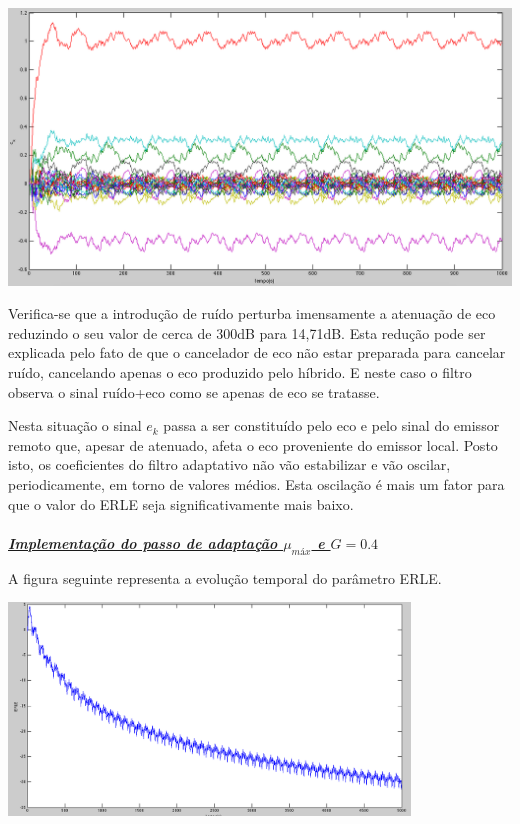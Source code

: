 \documentclass[a4paper,11pt]{report}
\begin{document}
\begin{center}
     \includegraphics[angle=0,width=1\textwidth]{c_k_G0_1}
     \label{fig:SRuRUIDOt}
\end{center}
     
Verifica-se que a introdução de ruído perturba imensamente a atenuação de eco reduzindo o seu valor de cerca de 300dB para 14,71dB. Esta redução pode ser explicada pelo fato de que o cancelador de eco não estar preparada para cancelar ruído, cancelando apenas o eco produzido pelo híbrido. E neste caso o filtro observa o sinal ruído+eco como se apenas de eco se tratasse.

Nesta situação o sinal $e_k$ passa a ser constituído pelo eco e pelo sinal do emissor remoto que, apesar de atenuado, afeta o eco proveniente do emissor local. Posto isto, os coeficientes do filtro adaptativo não vão estabilizar e vão oscilar, periodicamente, em torno de valores médios. Esta oscilação é mais um fator para que o valor do ERLE seja significativamente mais baixo.
\paragraph{}


\large\underline{{\textit{\textbf{Implementação do passo de adaptação $\mu_{máx}$ e $G=0.4$}}}}\\
\par

A figura seguinte representa a evolução temporal do parâmetro ERLE.

\begin{center}
     \includegraphics[angle=0,width=0.8\textwidth]{ERLE_G0_4_umax}
     \label{fig:SRuERLEt}
\end{center}
\end{document}
